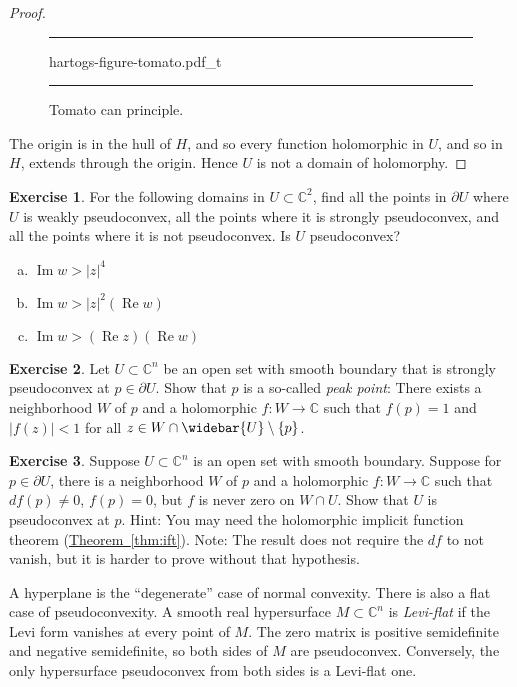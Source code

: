 \documentclass[12pt,openany]{book}
\renewcommand{\Re}{\operatorname{Re}}
\renewcommand{\Im}{\operatorname{Im}}
\newcommand{\sabs}[1]{\lvert {#1} \rvert}
\newcommand{\C}{{\mathbb{C}}}
\newcommand{\myindex}[1]{#1\index{#1}}
\theoremstyle{plain}
\theoremstyle{remark}
\theoremstyle{definition}
\newenvironment{exbox}{%
    \def\FrameCommand{\vrule width 1pt \relax\hspace{10pt}}%
    \MakeFramed{\advance\hsize-\width\FrameRestore}%
}{%
    \endMakeFramed
}
\newenvironment{exparts}{%
    \leavevmode\begin{enumerate}[a),noitemsep,topsep=0pt,parsep=0pt,partopsep=0pt]
}{%
    \end{enumerate}
}
\newenvironment{myfig}{%
\begin{figure}[h!t]
\noindent\rule{\textwidth}{0.5pt}\vspace{12pt}\par\centering}%
{\par\noindent\rule{\textwidth}{0.5pt}
\end{figure}}
\theoremstyle{exercise}
\newtheorem{exercise}{Exercise}[section]
\theoremstyle{example}
\newcommand{\thmref}[1]{\hyperref[#1]{Theorem~\ref*{#1}}}
\begin{document}
\begin{proof}
\begin{myfig}
{hartogs-figure-tomato.pdf_t}
\caption{Tomato can principle.\label{fig:hartogs-figure-tomato}}
\end{myfig}

The origin is in the hull of $H$, and so
every function holomorphic in $U$, and so in $H$, extends through the origin.
Hence $U$ is not a domain of holomorphy.
\end{proof}

\begin{exbox}
\begin{exercise}
\pagebreak[2]
For the following domains in $U \subset \C^2$,
find all the
points in $\partial U$ where $U$ is weakly pseudoconvex, all the points
where it is strongly pseudoconvex, and all the points where it is
not pseudoconvex.  Is $U$ pseudoconvex?
\begin{exparts}
\item
$\Im w > \sabs{z}^4$
\item
$\Im w > \sabs{z}^2(\Re w)$
\item
$\Im w > (\Re z)(\Re w)$
\end{exparts}
\end{exercise}

\begin{exercise}
\pagebreak[2]
Let $U \subset \C^n$ be an open set with smooth boundary that is
strongly pseudoconvex at $p \in \partial U$.  Show that
$p$ is a so-called \emph{\myindex{peak point}}: There
exists a neighborhood $W$ of $p$ and a holomorphic
$f \colon W \to \C$ such that $f(p)=1$ and $\sabs{f(z)} < 1$ for all
$z \in W \cap \widebar{U} \setminus \{ p \}$.
\end{exercise}

\begin{exercise}
Suppose $U \subset \C^n$ is an open set with smooth boundary.  Suppose
for $p \in \partial U$, there is a neighborhood $W$ of $p$
and a holomorphic $f \colon W \to
\C$ such that $df(p) \not= 0$, $f(p) = 0$, but
$f$ is never zero on $W \cap U$.  Show that $U$ is pseudoconvex
at $p$.  Hint: You may need the holomorphic implicit function theorem
(\thmref{thm:ift}).
Note: The result does not require the $df$ to not vanish, but it is
harder to prove without that hypothesis.
\end{exercise}
\end{exbox}

A hyperplane is the ``degenerate'' case of normal convexity.
There is also a flat case of pseudoconvexity.  A smooth real hypersurface
$M \subset \C^n$ is \emph{\myindex{Levi-flat}} if the Levi form
vanishes at every point of $M$.  The zero matrix is positive semidefinite
and negative semidefinite, so both sides of $M$ are pseudoconvex.
Conversely, the only hypersurface pseudoconvex from both sides is a
Levi-flat one.
\end{document}
